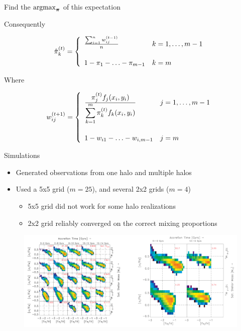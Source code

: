 \documentclass{beamer}
\newcommand{\vect}[1]{\boldsymbol{\mathbf{#1}}}
\newcommand{\argmax}{\operatornamewithlimits{argmax}}
\newcommand{\eqnset}[4]{
\[ #1 = #2 \left\{ \begin{array}{#3}
        #4
\end{array} \right. \] 
}
\newcommand{\vp}{\vect{\pi}}
\newcommand{\sumn}{\sum^n_{i=1}}
\newcommand{\sumk}{\sum^m_{k=1}}
\newcommand{\fab}{f_j}
\begin{document}
\begin{frame}{Find the $\argmax_{\vp}$ of this expectation}
	
	
	Consequently
	\eqnset{\hat{\pi}^{(t)}_k }{}{ll}{
		\frac{\sumn w^{(t-1)}_{ij}}{n}			& k=1,\ldots,m-1	\\
		\vspace{1mm} & \\
		1-\pi_1-\ldots-\pi_{m-1}		& k=m
	}
	
		Where
	\eqnset{w^{(t+1)}_{ij}}{}{ll}{
		\frac{\displaystyle\pi^{(t)}_{j} \fab(x_i,y_i)}{\displaystyle\sumk \pi^{(t)}_{k}f_k(x_i,y_i)}				& j=1,\ldots,m-1	\\
		\vspace{1mm} & \\
		1 - w_{i1} - \ldots - w_{i,m-1}		& j=m
	}
	
\end{frame}





\begin{frame}{Simulations}
	
	
	
	
	\begin{itemize}
		\item Generated observations from one halo and multiple halos
		
		\item Used a 5x5 grid ($m=25$), and several 2x2 grids ($m=4$)
		\begin{itemize}
			\item 5x5 grid did not work for some halo realizations
			\item 2x2 grid reliably converged on the correct mixing proportions
		\end{itemize}
	\end{itemize}
	
	
	
	\begin{figure}
			\begin{center}
				\includegraphics[width=\textwidth]{ourdens.pdf}
			\end{center}
	\end{figure}
	
	
	
	
\end{frame}
\end{document}

